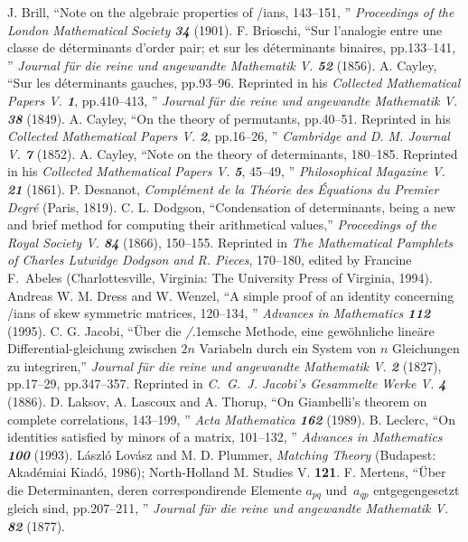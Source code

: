 \documentclass[a4paper,12pt]{article}
\begin{document}
\bigskip
\begin{thebibliography}{99}
 J. Brill, ``Note on the algebraic properties of \Pfaff/ians, 143--151, '' {\sl Proceedings of the London Mathematical Society\/ \bf34} (1901).
 F. Brioschi, ``Sur l'analogie entre une classe de d\'eterminants d'order pair; et sur les d\'e\-ter\-mi\-nants  binaires, pp.133--141, '' {\sl Journal f\"ur die reine und angewandte Mathematik\/ V. \bf 52} (1856).
 A. Cayley, ``Sur les d\'eterminants gauches, pp.93--96. Reprinted in his {\sl Collected Mathematical Papers\/ V. \bf 1}, pp.410--413, ''  {\sl Journal f\"ur die reine und angewandte Mathematik\/  V. \bf 38} (1849).
 A. Cayley, ``On the theory of permutants, pp.40--51. Reprinted in his {\sl Collected Mathematical Papers\/ V. \bf 2}, pp.16--26, '' {\sl Cambridge and D. M. Journal\/ V. \bf 7} (1852).
 A. Cayley, ``Note on the theory of determinants, 180--185. Reprinted in his {\sl Collected Mathematical Papers\/ V. \bf 5}, 45--49, '' {\sl Philosophical Magazine\/ V. \bf 21} (1861).
 P. Desnanot, {\sl Compl\'ement de la Th\'eorie des \'Equations du Premier Degr\'e\/} (Paris, 1819).
 C. L. Dodgson, ``Condensation of determinants, being a new and brief method for computing their arithmetical values,'' {\sl Proceedings of the Royal Society\/ V. \bf 84} (1866), 150--155. Reprinted in {\sl The Mathematical Pamphlets of Charles Lutwidge Dodgson and R. Pieces}, 170--180,  edited by Francine F.~Abeles (Charlottesville, Virginia: The University Press of Virginia, 1994).
 Andreas W. M. Dress and W. Wenzel, ``A simple proof of an identity concerning \Pfaff/ians of skew symmetric matrices, 120--134, '' {\sl Advances in Mathematics\/ \bf112} (1995).
 C. G. Jacobi, ``\"Uber die {\it \Pfaff/}\kern.1emsche Methode, eine gew\"ohnliche line\"are Differential-gleichung zwischen $2n$ Variabeln durch ein System von $n$ Gleichungen zu integriren,'' {\sl Journal f\"ur die reine und angewandte Mathematik\/ V. \bf 2} (1827), pp.17--29,  pp.347--357. Reprinted in {\sl C.~G.~J. Jacobi's Gesammelte Werke\/ V. \bf 4} (1886).
 D. Laksov, A. Lascoux and A. Thorup, ``On Giambelli's theorem on complete correlations, 143--199, '' {\sl Acta Mathematica\/ \bf162} (1989).
B. Leclerc, ``On identities satisfied by minors of a matrix, 101--132, '' {\sl Advances in Mathematics\/ \bf100} (1993).
 L\'aszl\'o Lov\'asz and M. D. Plummer, {\sl Matching Theory\/} (Budapest: Akad\'emiai Kiad\'o, 1986); North-Holland M. Studies {V. \bf 121}.
 F. Mertens, ``\"Uber die Determinanten, deren correspondirende Elemente $a_{pq}$ und~$a_{qp}$ ent\-gegen\-gesetzt gleich sind, pp.207--211, ''  {\sl Journal f\"ur die reine und angewandte Mathematik\/ V. \bf 82} (1877).

\end{thebibliography}
\end{document}

